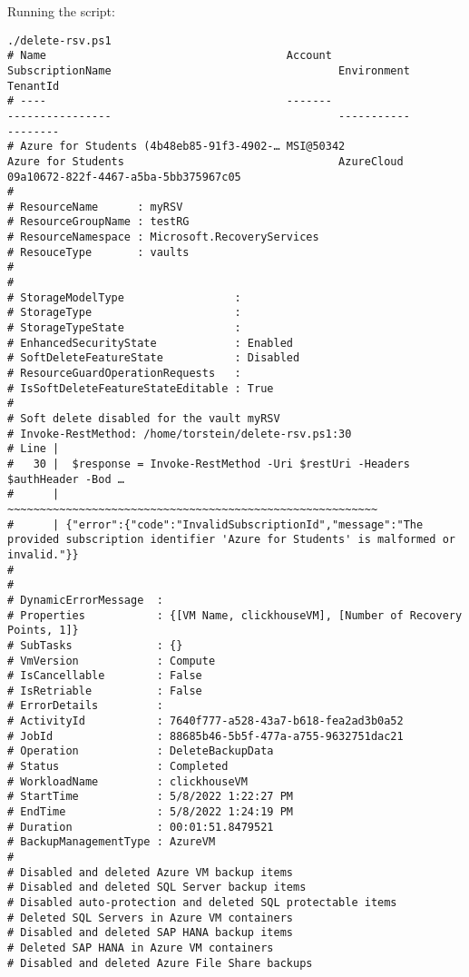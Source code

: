 Running the script:
\begin{verbatim}
./delete-rsv.ps1
# Name                                     Account                                            SubscriptionName                                   Environment                                        TenantId
# ----                                     -------                                            ----------------                                   -----------                                        --------
# Azure for Students (4b48eb85-91f3-4902-… MSI@50342                                          Azure for Students                                 AzureCloud                                         09a10672-822f-4467-a5ba-5bb375967c05
#
# ResourceName      : myRSV
# ResourceGroupName : testRG
# ResourceNamespace : Microsoft.RecoveryServices
# ResouceType       : vaults
#
#
# StorageModelType                 :
# StorageType                      :
# StorageTypeState                 :
# EnhancedSecurityState            : Enabled
# SoftDeleteFeatureState           : Disabled
# ResourceGuardOperationRequests   :
# IsSoftDeleteFeatureStateEditable : True
#
# Soft delete disabled for the vault myRSV
# Invoke-RestMethod: /home/torstein/delete-rsv.ps1:30
# Line |
#   30 |  $response = Invoke-RestMethod -Uri $restUri -Headers $authHeader -Bod …
#      |              ~~~~~~~~~~~~~~~~~~~~~~~~~~~~~~~~~~~~~~~~~~~~~~~~~~~~~~~~~
#      | {"error":{"code":"InvalidSubscriptionId","message":"The provided subscription identifier 'Azure for Students' is malformed or invalid."}}
#
#
# DynamicErrorMessage  :
# Properties           : {[VM Name, clickhouseVM], [Number of Recovery Points, 1]}
# SubTasks             : {}
# VmVersion            : Compute
# IsCancellable        : False
# IsRetriable          : False
# ErrorDetails         :
# ActivityId           : 7640f777-a528-43a7-b618-fea2ad3b0a52
# JobId                : 88685b46-5b5f-477a-a755-9632751dac21
# Operation            : DeleteBackupData
# Status               : Completed
# WorkloadName         : clickhouseVM
# StartTime            : 5/8/2022 1:22:27 PM
# EndTime              : 5/8/2022 1:24:19 PM
# Duration             : 00:01:51.8479521
# BackupManagementType : AzureVM
#
# Disabled and deleted Azure VM backup items
# Disabled and deleted SQL Server backup items
# Disabled auto-protection and deleted SQL protectable items
# Deleted SQL Servers in Azure VM containers
# Disabled and deleted SAP HANA backup items
# Deleted SAP HANA in Azure VM containers
# Disabled and deleted Azure File Share backups

\end{verbatim}
